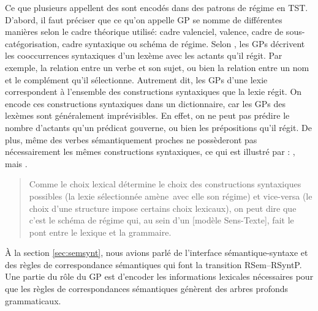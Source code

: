 Ce que plusieurs appellent des  sont encodés dans des patrons de régime en TST. D'abord, il faut préciser que ce qu'on appelle \ac{GP} se nomme de différentes manières selon le cadre théorique utilisé: cadre valenciel, valence, cadre de sous-catégorisation, cadre syntaxique ou schéma de régime. Selon \cite{MilicevicSchemaregimepont2009}, les \acp{GP} décrivent les cooccurrences syntaxiques d'un lexème avec les actants qu'il régit. Par exemple, la relation entre un verbe et son sujet, ou bien la relation entre un nom et le complément qu'il sélectionne. Autrement dit, les \acp{GP} d'une lexie correspondent à l'ensemble des constructions syntaxiques que la lexie régit. On encode ces constructions syntaxiques dans un dictionnaire, car les \acp{GP} des lexèmes sont généralement imprévisibles. En effet, on ne peut pas prédire le nombre d'actants qu'un prédicat gouverne, ou bien les prépositions qu'il régit. De plus, même des verbes sémantiquement proches ne possèderont pas nécessairement les mêmes constructions syntaxiques, ce qui est illustré par \cite{MilicevicSchemaregimepont2009}: , mais .

\begin{quote}
Comme le choix lexical détermine le choix des constructions syntaxiques possibles (la lexie sélectionnée \og amène\fg\ avec elle son régime) et vice-versa (le choix d’une structure impose certains choix lexicaux), on peut dire que c’est le schéma de régime qui, au sein d’un [modèle Sens-Texte], fait le pont entre le lexique et la grammaire.
\end{quote}
\vspace{-\baselineskip}
\hfill
\cite[p.~105]{MilicevicSchemaregimepont2009}

À la section \ref{sec:semsynt}, nous avions parlé de l'interface sémantique-syntaxe et des règles de correspondance sémantiques qui font la transition \ac{RSem}--\ac{RSyntP}. Une partie du rôle du \ac{GP} est d'encoder les informations lexicales nécessaires pour que les règles de correspondances sémantiques génèrent des arbres profonds grammaticaux. 

